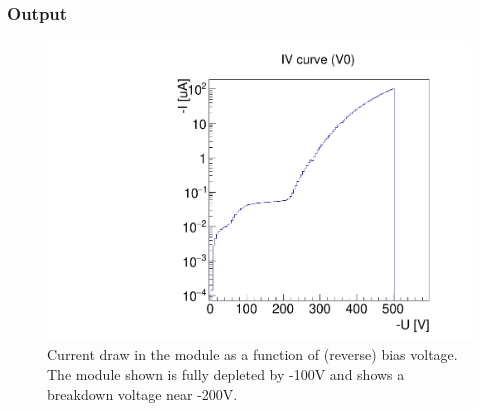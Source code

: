 \subsubsection{Output}

\begin{figure}[!htp]
\centering
\begin{minipage}{0.45\textwidth}
  \includegraphics[width=1.0\textwidth]{figures/iv_IVcurve.pdf}
  \caption{Current draw in the module as a function of (reverse) bias voltage.
The module shown is fully depleted by -100V and shows a breakdown voltage near -200V.}
  \label{fig:iv_IVcurve}
\end{minipage}
\end{figure}
